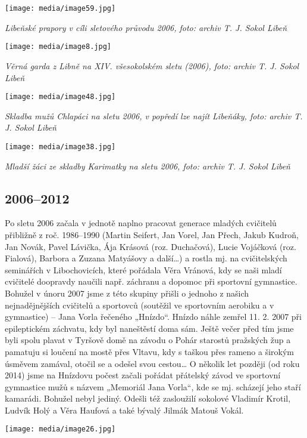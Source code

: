 \texttt{[image: media/image59.jpg]}

\emph{Libeňské prapory v cíli sletového průvodu 2006, foto: archiv T. J.
Sokol Libeň}

\texttt{[image: media/image8.jpg]}

\emph{Věrná garda z Libně na XIV. všesokolském sletu (2006), foto:
archiv T. J. Sokol Libeň}

\texttt{[image: media/image48.jpg]}

\emph{Skladba mužů Chlapáci na sletu 2006, v popředí lze najít Libeňáky,
foto: archiv T. J. Sokol Libeň}

\texttt{[image: media/image38.jpg]}

\emph{Mladší žáci ze skladby Karimatky na sletu 2006, foto: archiv T. J.
Sokol Libeň}

\subsection{2006--2012}\label{section-1}

Po sletu 2006 začala v jednotě naplno pracovat generace mladých
cvičitelů přibližně z roč. 1986--1990 (Martin Seifert, Jan Vorel, Jan
Přech, Jakub Kudroň, Jan Novák, Pavel Lávička, Ája Krásová (roz.
Duchačová), Lucie Vojáčková (roz. Fialová), Barbora a Zuzana Matyášovy a
další\ldots) a rostla mj. na cvičitelských seminářích v Libochovicích,
které pořádala Věra Vránová, kdy se naši mladí cvičitelé doopravdy
naučili např. záchranu a dopomoc při sportovní gymnastice. Bohužel v
únoru 2007 jsme z této skupiny přišli o jednoho z našich nejnadějnějších
cvičitelů a sportovců (soutěžil ve sportovním aerobiku a v gymnastice)
-- Jana Vorla řečeného „Hnízdo``. Hnízdo náhle zemřel 11. 2. 2007 při
epileptickém záchvatu, kdy byl naneštěstí doma sám. Ještě večer před tím
jsme byli spolu plavat v Tyršově domě na závodu o Pohár starostů
pražských žup a pamatuju si loučení na mostě přes Vltavu, kdy s taškou
přes rameno a širokým úsměvem zamával, otočil se a odešel svou
cestou\ldots{} O několik let později (od roku 2014) jsme na Hnízdovu
počest začali pořádat přátelský závod ve sportovní gymnastice mužů s
názvem „Memoriál Jana Vorla``, kde se mj. scházejí jeho staří kamarádi.
Bohužel nebyl jediný. Odešli též zasloužilí sokolové Vladimír Krotil,
Ludvík Holý a Věra Haufová a také bývalý Jilmák Matouš Vokál.

\texttt{[image: media/image26.jpg]}

